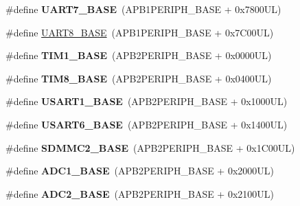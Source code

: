 \begin{DoxyCompactItemize}
\#define {\bfseries U\+A\+R\+T7\+\_\+\+B\+A\+SE}~(A\+P\+B1\+P\+E\+R\+I\+P\+H\+\_\+\+B\+A\+SE + 0x7800\+U\+L)
\item 
\#define \mbox{\hyperlink{group___peripheral__memory__map_gac9c6cd59a248941d9d2462ab21a2346e}{U\+A\+R\+T8\+\_\+\+B\+A\+SE}}~(A\+P\+B1\+P\+E\+R\+I\+P\+H\+\_\+\+B\+A\+SE + 0x7\+C00\+U\+L)
\item 
\mbox{\label{group___peripheral__memory__map_gaf8aa324ca5011b8173ab16585ed7324a}} 
\#define {\bfseries T\+I\+M1\+\_\+\+B\+A\+SE}~(A\+P\+B2\+P\+E\+R\+I\+P\+H\+\_\+\+B\+A\+SE + 0x0000\+U\+L)
\item 
\mbox{\label{group___peripheral__memory__map_ga5b72f698b7a048a6f9fcfe2efe5bc1db}} 
\#define {\bfseries T\+I\+M8\+\_\+\+B\+A\+SE}~(A\+P\+B2\+P\+E\+R\+I\+P\+H\+\_\+\+B\+A\+SE + 0x0400\+U\+L)
\item 
\mbox{\label{group___peripheral__memory__map_ga86162ab3f740db9026c1320d46938b4d}} 
\#define {\bfseries U\+S\+A\+R\+T1\+\_\+\+B\+A\+SE}~(A\+P\+B2\+P\+E\+R\+I\+P\+H\+\_\+\+B\+A\+SE + 0x1000\+U\+L)
\item 
\mbox{\label{group___peripheral__memory__map_gade4d3907fd0387ee832f426f52d568bb}} 
\#define {\bfseries U\+S\+A\+R\+T6\+\_\+\+B\+A\+SE}~(A\+P\+B2\+P\+E\+R\+I\+P\+H\+\_\+\+B\+A\+SE + 0x1400\+U\+L)
\item 
\mbox{\label{group___peripheral__memory__map_ga8cf4fba4e003a1d2b8b3c6c75e7aa8e4}} 
\#define {\bfseries S\+D\+M\+M\+C2\+\_\+\+B\+A\+SE}~(A\+P\+B2\+P\+E\+R\+I\+P\+H\+\_\+\+B\+A\+SE + 0x1\+C00\+U\+L)
\item 
\mbox{\label{group___peripheral__memory__map_ga695c9a2f892363a1c942405c8d351b91}} 
\#define {\bfseries A\+D\+C1\+\_\+\+B\+A\+SE}~(A\+P\+B2\+P\+E\+R\+I\+P\+H\+\_\+\+B\+A\+SE + 0x2000\+U\+L)
\item 
\mbox{\label{group___peripheral__memory__map_ga6544abc57f9759f610eee09a02442ae6}} 
\#define {\bfseries A\+D\+C2\+\_\+\+B\+A\+SE}~(A\+P\+B2\+P\+E\+R\+I\+P\+H\+\_\+\+B\+A\+SE + 0x2100\+U\+L)
\item 

\end{DoxyCompactItemize}
